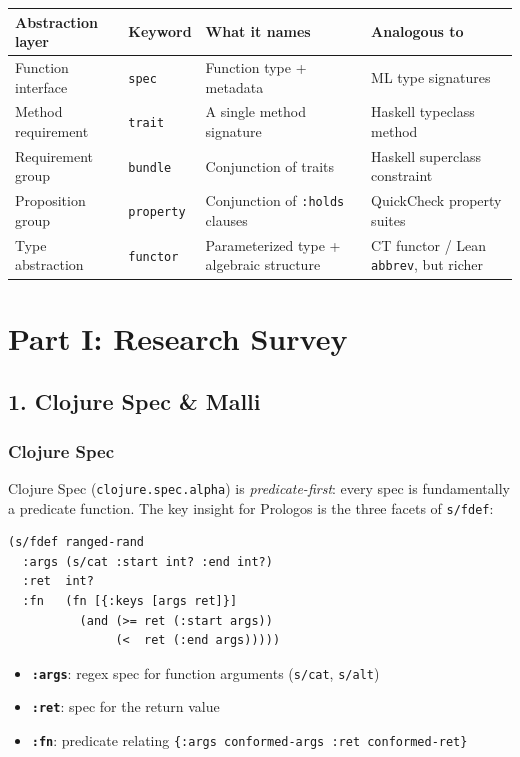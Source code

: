 \documentclass[11pt]{article}
\begin{document}
\begin{center}
\begin{tabular}{llll}
Abstraction layer & Keyword & What it names & Analogous to\\
\hline
Function interface & \texttt{spec} & Function type + metadata & ML type signatures\\
Method requirement & \texttt{trait} & A single method signature & Haskell typeclass method\\
Requirement group & \texttt{bundle} & Conjunction of traits & Haskell superclass constraint\\
Proposition group & \texttt{property} & Conjunction of \texttt{:holds} clauses & QuickCheck property suites\\
Type abstraction & \texttt{functor} & Parameterized type + algebraic structure & CT functor / Lean \texttt{abbrev}, but richer\\
\end{tabular}
\end{center}
\section{Part I: Research Survey}
\label{sec:org527adb9}

\subsection{1. Clojure Spec \& Malli}
\label{sec:orga562454}

\subsubsection{Clojure Spec}
\label{sec:org99aa5bc}

Clojure Spec (\texttt{clojure.spec.alpha}) is \emph{predicate-first}: every spec is
fundamentally a predicate function. The key insight for Prologos is the three
facets of \texttt{s/fdef}:

\begin{verbatim}
(s/fdef ranged-rand
  :args (s/cat :start int? :end int?)
  :ret  int?
  :fn   (fn [{:keys [args ret]}]
          (and (>= ret (:start args))
               (<  ret (:end args)))))
\end{verbatim}

\begin{itemize}
\item \textbf{\texttt{:args}}: regex spec for function arguments (\texttt{s/cat}, \texttt{s/alt})
\item \textbf{\texttt{:ret}}: spec for the return value
\item \textbf{\texttt{:fn}}: predicate relating \texttt{\{:args conformed-args :ret conformed-ret\}}
\end{itemize}
\end{document}
